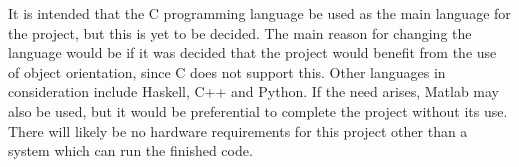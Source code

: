 \documentclass[10pt,a4paper]{article}
\begin{document}
It is intended that the C programming language be used as the main language for the project, but this is yet to be decided. The main reason for changing the language would be if it was decided that the project would benefit from the use of object orientation, since C does not support this. Other languages in consideration include Haskell, C++ and Python. If the need arises, Matlab may also be used, but it would be preferential to complete the project without its use. There will likely be no hardware requirements for this project other than a system which can run the finished code. 
\end{document}
